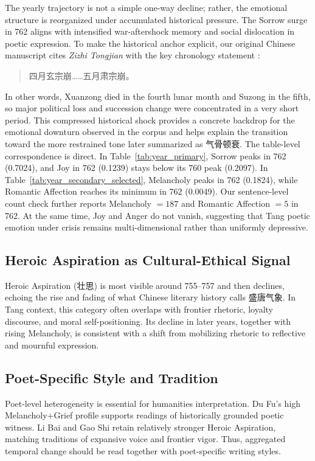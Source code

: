 \documentclass[11pt]{article}
\newcommand{\zh}[1]{{\zhfont #1}}
\begin{document}
The yearly trajectory is not a simple one-way decline; rather, the emotional structure is reorganized under accumulated historical pressure.
The Sorrow surge in 762 aligns with intensified war-aftershock memory and social dislocation in poetic expression.
To make the historical anchor explicit, our original Chinese manuscript cites \textit{Zizhi Tongjian} with the key chronology statement \citep{zizhi-tongjian-1956}:
\begin{quote}
\small
\zh{四月玄宗崩……五月肃宗崩。}
\end{quote}
In other words, Xuanzong died in the fourth lunar month and Suzong in the fifth, so major political loss and succession change were concentrated in a very short period.
This compressed historical shock provides a concrete backdrop for the emotional downturn observed in the corpus and helps explain the transition toward the more restrained tone later summarized as \zh{气骨顿衰}.
The table-level correspondence is direct.
In Table~\ref{tab:year_primary}, Sorrow peaks in 762 (0.7024), and Joy in 762 (0.1239) stays below its 760 peak (0.2097).
In Table~\ref{tab:year_secondary_selected}, Melancholy peaks in 762 (0.1824), while Romantic Affection reaches its minimum in 762 (0.0049).
Our sentence-level count check further reports Melancholy \(=187\) and Romantic Affection \(=5\) in 762.
At the same time, Joy and Anger do not vanish, suggesting that Tang poetic emotion under crisis remains multi-dimensional rather than uniformly depressive.

\subsection{Heroic Aspiration as Cultural-Ethical Signal}

Heroic Aspiration (\zh{壮思}) is most visible around 755--757 and then declines, echoing the rise and fading of what Chinese literary history calls \zh{盛唐气象}.
In Tang context, this category often overlaps with frontier rhetoric, loyalty discourse, and moral self-positioning.
Its decline in later years, together with rising Melancholy, is consistent with a shift from mobilizing rhetoric to reflective and mournful expression.

\subsection{Poet-Specific Style and Tradition}

Poet-level heterogeneity is essential for humanities interpretation.
Du Fu's high Melancholy+Grief profile supports readings of historically grounded poetic witness.
Li Bai and Gao Shi retain relatively stronger Heroic Aspiration, matching traditions of expansive voice and frontier vigor.
Thus, aggregated temporal change should be read together with poet-specific writing styles.
\end{document}
